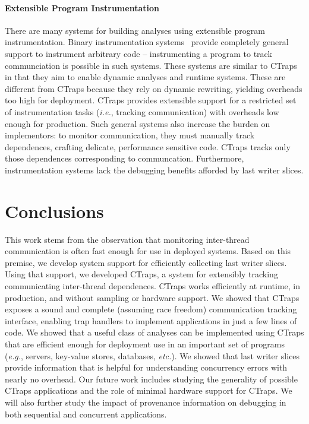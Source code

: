\documentclass[preprint,9pt]{sigplanconf}
\newcommand{\ctraps}{CTraps\xspace}
\begin{document}
\paragraph{Extensible Program Instrumentation}
There are many systems for building analyses using extensible program
instrumentation.  Binary instrumentation
systems~\cite{pin,dynamorio,valgrind,roadrunner} provide completely general
support to instrument arbitrary code -- instrumenting a program to track
communciation is possible in such systems.  These systems are similar to
\ctraps in that they aim to enable dynamic analyses and runtime systems.  These
are different from \ctraps because they rely on dynamic rewriting, yielding
overheads too high for deployment.  \ctraps provides extensible support for a
restricted set of instrumentation tasks ({\em i.e.}, tracking communication)
with overheads low enough for production.  Such general systems also increase
the burden on implementors: to monitor communication, they must manually track
dependences, crafting delicate, performance sensitive code.  \ctraps tracks
only those dependences corresponding to communcation.  Furthermore, 
instrumentation systems lack the debugging benefits afforded by last writer slices.

\section{Conclusions}
This work stems from the observation that monitoring inter-thread communication
is often fast enough for use in deployed systems.  Based on this premise, we
develop system support for efficiently collecting last writer slices.  Using
that support, we developed \ctraps, a system for extensibly tracking
communicating inter-thread dependences.  \ctraps works efficiently at runtime,
in production, and without sampling or hardware support.  We showed that
\ctraps exposes a sound and complete (assuming race freedom) communication
tracking interface, enabling trap handlers to implement applications in just a
few lines of code.  We showed that a useful class of analyses can be
implemented using \ctraps that are efficient enough for deployment use in an
important set of programs ({\em e.g.}, servers, key-value stores, databases,
{\em etc.}).  We showed that last writer slices provide information that is
helpful for understanding concurrency errors with nearly no overhead.  Our
future work includes studying the generality of possible \ctraps applications
and the role of minimal hardware support for \ctraps.  We will also further study the
impact of provenance information on debugging in both sequential and concurrent
applications. 




{}

\end{document}
